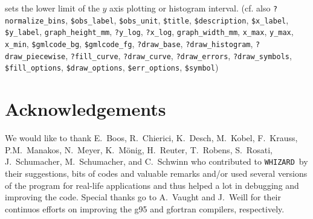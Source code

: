 \documentclass[12pt]{book}
\newcommand{\ttt}[1]{\texttt{#1}}
\newcommand{\whizard}{\texttt{WHIZARD}}
\begin{document}
\begin{itemize}
sets the lower limit of the $y$ axis plotting or histogram interval. (cf. also
\ttt{?normalize\_bins}, \ttt{\$obs\_label}, \ttt{\$obs\_unit},
\ttt{\$title}, \ttt{\$description}, \ttt{\$x\_label},
\ttt{\$y\_label}, \ttt{graph\_height\_mm}, \ttt{?y\_log},
\newline \ttt{?x\_log}, \ttt{graph\_width\_mm}, \ttt{x\_max},
\ttt{y\_max}, \ttt{x\_min}, \ttt{\$gmlcode\_bg}, \ttt{\$gmlcode\_fg},
\ttt{?draw\_base}, \newline \ttt{?draw\_histogram}, \ttt{?draw\_piecewise},
\ttt{?fill\_curve}, \ttt{?draw\_curve}, \ttt{?draw\_errors},
\newline \ttt{?draw\_symbols}, \ttt{\$fill\_options}, \ttt{\$draw\_options},
\ttt{\$err\_options}, \ttt{\$symbol})
\end{itemize}

\clearpage
\section*{Acknowledgements}

We would like to thank E.~Boos, R.~Chierici, K.~Desch, M.~Kobel,
F.~Krauss, P.M.~Manakos, N.~Meyer, K.~M\"onig, H.~Reuter, T.~Robens,
S.~Rosati, J.~Schumacher, M.~Schumacher, and C.~Schwinn who
contributed to \whizard\ by their suggestions, bits of codes and
valuable remarks and/or used several versions of the program for
real-life applications and thus helped a lot in debugging and
improving the code.  Special thanks go to A.~Vaught and J.~Weill for
their continuos efforts on improving the g95 and gfortran compilers,
respectively. 
\end{document}
